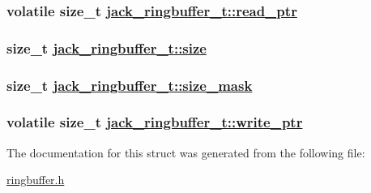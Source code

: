 \hypertarget{structjack__ringbuffer__t_ec57ab29388b672b9cbf9449db49d3fd}{
\subsubsection[read\_\-ptr]{\setlength{\rightskip}{0pt plus 5cm}volatile size\_\-t \hyperlink{structjack__ringbuffer__t_ec57ab29388b672b9cbf9449db49d3fd}{jack\_\-ringbuffer\_\-t::read\_\-ptr}}}
\label{structjack__ringbuffer__t_ec57ab29388b672b9cbf9449db49d3fd}


\hypertarget{structjack__ringbuffer__t_f7bd60b75b29d79b660a2859395c1a24}{
\subsubsection[size]{\setlength{\rightskip}{0pt plus 5cm}size\_\-t \hyperlink{structjack__ringbuffer__t_f7bd60b75b29d79b660a2859395c1a24}{jack\_\-ringbuffer\_\-t::size}}}
\label{structjack__ringbuffer__t_f7bd60b75b29d79b660a2859395c1a24}


\hypertarget{structjack__ringbuffer__t_a9eab63ea367d985becc6f47c312addd}{
\subsubsection[size\_\-mask]{\setlength{\rightskip}{0pt plus 5cm}size\_\-t \hyperlink{structjack__ringbuffer__t_a9eab63ea367d985becc6f47c312addd}{jack\_\-ringbuffer\_\-t::size\_\-mask}}}
\label{structjack__ringbuffer__t_a9eab63ea367d985becc6f47c312addd}


\hypertarget{structjack__ringbuffer__t_9ecd600e9f148f5d6b55f335b3466c2e}{
\subsubsection[write\_\-ptr]{\setlength{\rightskip}{0pt plus 5cm}volatile size\_\-t \hyperlink{structjack__ringbuffer__t_9ecd600e9f148f5d6b55f335b3466c2e}{jack\_\-ringbuffer\_\-t::write\_\-ptr}}}
\label{structjack__ringbuffer__t_9ecd600e9f148f5d6b55f335b3466c2e}




The documentation for this struct was generated from the following file:\begin{CompactItemize}
\item 
\hyperlink{ringbuffer_8h}{ringbuffer.h}\end{CompactItemize}

